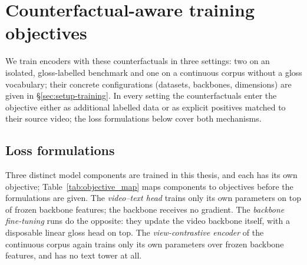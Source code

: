 \section{Counterfactual-aware training objectives}
\label{sec:method-objectives}
We train encoders with these counterfactuals in three settings:
two on an isolated, gloss-labelled benchmark and one on a continuous
corpus without a gloss vocabulary; their concrete configurations
(datasets, backbones, dimensions) are given in
\S\ref{sec:setup-training}. In every setting the counterfactuals enter
the objective either as additional labelled data or as explicit
positives matched to their source video; the loss formulations below
cover both mechanisms.

\subsection{Loss formulations}
\label{sec:method-losses}
Three distinct model components are trained in this thesis, and each has
its own objective; Table~\ref{tab:objective_map} maps components to
objectives before the formulations are given. The \emph{video--text
head} trains only its own parameters on top of frozen backbone features;
the backbone receives no gradient. The \emph{backbone fine-tuning}
runs do the opposite: they update the video backbone itself, with a
disposable linear gloss head on top. The \emph{view-contrastive encoder}
of the continuous corpus again trains only its own parameters over
frozen backbone features, and has no text tower at all.

